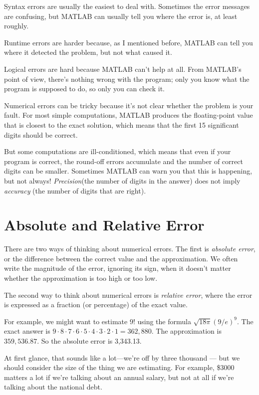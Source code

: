 Syntax errors are usually the easiest to deal with.  Sometimes the error messages
are confusing, but MATLAB can usually tell you where the error is, at
least roughly.

Runtime errors are harder because, as I mentioned before, MATLAB
can tell you where it detected the problem, but not what caused it.

Logical errors are hard because MATLAB can't help at all.  
From MATLAB's point of view, there's nothing wrong with the program; only you
know what the program is supposed to do, so only you can check it.


Numerical errors can be tricky because it's not clear whether the
problem is your fault.  For most simple computations, MATLAB produces
the floating-point value that is closest to the exact solution, which
means that the first 15 significant digits should be correct.  

But some computations are ill-conditioned, which means that even if your program is correct, the round-off errors accumulate and the number of correct digits can be smaller.  Sometimes MATLAB can warn you that
this is happening, but not always!  \emph{Precision}(the number of digits
in the answer) does not imply \emph{accuracy} (the number of digits that
are right).


\section{Absolute and Relative Error}

There are two ways of thinking about numerical errors. 
The first is \emph{absolute error}, or the difference between the correct value and the approximation.  We often write the magnitude of the error,
ignoring its sign, when it doesn't matter whether the approximation
is too high or too low.
 

The second way to think about numerical errors is \emph{relative error}, where the error is expressed as a fraction (or percentage) of the exact value.

For example, we might want to estimate $9!$ using the formula 
$\sqrt {18 \pi} ( 9 / e)^9$.  The exact answer is $9 \cdot 8 \cdot 7 \cdot 6
\cdot 5 \cdot 4 \cdot 3 \cdot 2 \cdot 1 = 362,880$.  The approximation
is $359,536.87$.  So the absolute error is 3,343.13.

At first glance, that sounds like a lot---we're off by three
thousand --- but we should consider the size of the
thing we are estimating.  For example, \$3000 matters a lot
if we're talking about an annual salary, but not at all if we're talking about the national debt.

